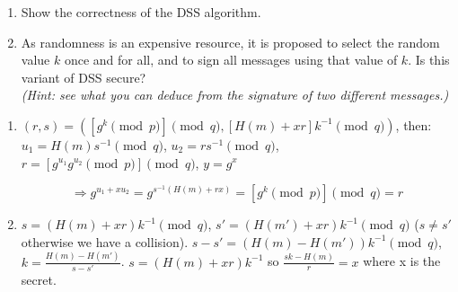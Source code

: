 \begin{enumerate}
	\item Show the correctness of the DSS algorithm.
	\item 
	As randomness is an expensive resource, it is proposed to select
	the random value $k$ once and for all, and to sign all messages
	using that value of $k$. Is this variant of DSS secure? \\
	\emph{(Hint: see what you can deduce from the signature of two
		different messages.)}
\end{enumerate}
\begin{solution}
  \begin{enumerate}
    \item
      $(r, s) = ([g^k \pmod{p}] \pmod{q}, [H(m) + xr]k^{-1} \pmod{q})$, then:
      $u_1 = H(m)s^{-1} \pmod{q}$,  $u_2 = rs^{-1} \pmod{q}$, $r = [g^{u_1} g^{u_2} \pmod{p}] \pmod{q}$, $y = g^x$

      $$\Rightarrow g^{u_1 + xu_2} = g^{s^{-1}(H(m) + rx)} = [g^k \pmod{p}] \pmod{q} = r$$
    \item
      $s = (H(m) + xr)k^{-1} \pmod{q}$, $s' = (H(m') + xr)k^{-1} \pmod{q}$ ($s \neq s'$ otherwise we have a collision).
      $s - s' = (H(m) - H(m'))k^{-1} \pmod{q}$, $k = \frac{H(m) - H(m')}{s - s'}$.
      $s = (H(m) + xr)k^{-1}$ so $\frac{sk - H(m)}{r} = x$ where x is the secret.
  \end{enumerate}
\end{solution}

